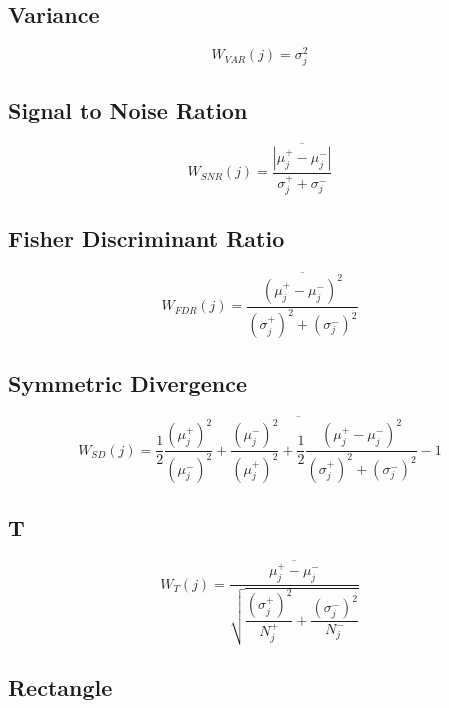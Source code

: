 \documentclass{article}
\begin{document}
\subsection{Variance}

\begin{equation} \label{Var}
W_{VAR}(j) = \sigma^{2}_{j}
\end{equation}

\subsection{Signal to Noise Ration}

\begin{equation} \label{SNR}
W_{SNR}(j) = \overline{\dfrac{| \mu^{+}_{j} - \mu^{-}_{j} |}{\sigma^{+}_{j} + \sigma^{-}_{j}}}
\end{equation}

\subsection{Fisher Discriminant Ratio}

\begin{equation} \label{FDR}
W_{FDR}(j) = \overline{\dfrac{( \mu^{+}_{j} - \mu^{-}_{j} )^{2}}{(\sigma^{+}_{j})^{2} + (\sigma^{-}_{j})^{2}}}
\end{equation}

\subsection{Symmetric Divergence}

\begin{equation} \label{SD}
W_{SD}(j) = \overline{\dfrac{1}{2} \dfrac{(\mu^{+}_{j})^{2}}{(\mu^{-}_{j})^{2}} + \dfrac{(\mu^{-}_{j})^{2}}{(\mu^{+}_{j})^{2}} + \dfrac{1}{2} \dfrac{( \mu^{+}_{j} - \mu^{-}_{j} )^{2}}{(\sigma^{+}_{j})^{2} + (\sigma^{-}_{j})^{2}} - 1}
\end{equation}

\subsection{T}

\begin{equation} \label{T}
W_{T}(j) = \overline{\dfrac{ \mu^{+}_{j} - \mu^{-}_{j}}{\sqrt{\dfrac{(\sigma^{+}_{j})^{2}}{N^{+}_{j}} + \dfrac{(\sigma^{-}_{j})^{2}}{N^{-}_{j}}}}}
\end{equation}

\subsection{Rectangle}
\end{document}
